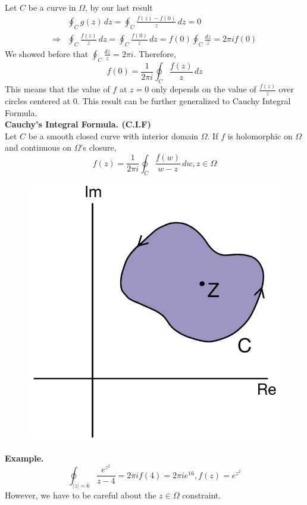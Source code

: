 \documentclass[11pt]{article}
\begin{document}
Let $C$ be a curve in $\Omega$, by our last result 
\begin{align*}
&\oint_C g(z) \, dz = \oint_C \frac{f(z) - f(0)}{z} \, dz = 0 \\ 
\Rightarrow &\oint_C \frac{f(z)}{z} \, dz = \oint_C \frac{f(0)}{z} \, dz = f(0)\oint_C \frac{dz}{z} = 2\pi if(0) 
\end{align*}
We showed before that $ \oint_C \frac{dz}{z} = 2\pi i$. Therefore, 
$$f(0) = \frac{1}{2\pi i} \oint_C \frac{f(z)}{z} \,dz$$
This means that the value of $f$ at $z = 0$ only depends on the value of $\frac{f(z)}{z}$ over circles centered at 0. This result can be further generalized to Cauchy Integral Formula. \\
\newline
\textbf{Cauchy's Integral Formula. (C.I.F)} \\
Let $C$ be a smooth closed curve with interior domain $\Omega$. If $f$ is holomorphic on $\Omega$ and continuous on $\Omega$'s closure, 
$$f(z) = \frac{1}{2\pi i}\oint_C \frac{f(w)}{w - z} \, dw, z \in \Omega$$
\begin{figure}[H]
\includegraphics[scale = 0.2]{13_5}
\centering
\end{figure} 
\textbf{Example.}
$$ \oint_{|z| = 6} \frac{e^{z^2}}{z - 4} = 2\pi if(4) = 2\pi i e^{16}, f(z) = e^{z^2}$$
However, we have to be careful about the $z \in \Omega$ constraint. 
\end{document}
